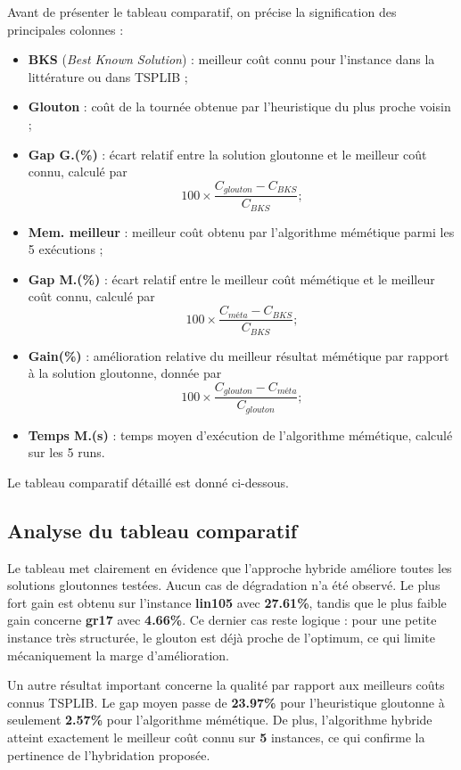 \documentclass[11pt,a4paper]{article}
\begin{document}
Avant de présenter le tableau comparatif, on précise la signification des principales colonnes :
\begin{itemize}[leftmargin=1.1cm]
    \item \textbf{BKS} (\emph{Best Known Solution}) : meilleur coût connu pour l'instance dans la littérature ou dans TSPLIB ;
    \item \textbf{Glouton} : coût de la tournée obtenue par l'heuristique du plus proche voisin ;
    \item \textbf{Gap G.(\%)} : écart relatif entre la solution gloutonne et le meilleur coût connu, calculé par
    \[
    100 \times \frac{C_{glouton} - C_{BKS}}{C_{BKS}} ;
    \]
    \item \textbf{Mem. meilleur} : meilleur coût obtenu par l'algorithme mémétique parmi les 5 exécutions ;
    \item \textbf{Gap M.(\%)} : écart relatif entre le meilleur coût mémétique et le meilleur coût connu, calculé par
    \[
    100 \times \frac{C_{méta} - C_{BKS}}{C_{BKS}} ;
    \]
    \item \textbf{Gain(\%)} : amélioration relative du meilleur résultat mémétique par rapport à la solution gloutonne, donnée par
    \[
    100 \times \frac{C_{glouton} - C_{méta}}{C_{glouton}} ;
    \]
    \item \textbf{Temps M.(s)} : temps moyen d'exécution de l'algorithme mémétique, calculé sur les 5 runs.
\end{itemize}

Le tableau comparatif détaillé est donné ci-dessous.

\small

\normalsize

\subsection{Analyse du tableau comparatif}
Le tableau met clairement en évidence que l'approche hybride améliore toutes les solutions gloutonnes testées. Aucun cas de dégradation n'a été observé. Le plus fort gain est obtenu sur l'instance \textbf{lin105} avec \textbf{27.61\%}, tandis que le plus faible gain concerne \textbf{gr17} avec \textbf{4.66\%}. Ce dernier cas reste logique : pour une petite instance très structurée, le glouton est déjà proche de l'optimum, ce qui limite mécaniquement la marge d'amélioration.

Un autre résultat important concerne la qualité par rapport aux meilleurs coûts connus TSPLIB. Le gap moyen passe de \textbf{23.97\%} pour l'heuristique gloutonne à seulement \textbf{2.57\%} pour l'algorithme mémétique. De plus, l'algorithme hybride atteint exactement le meilleur coût connu sur \textbf{5} instances, ce qui confirme la pertinence de l'hybridation proposée.
\end{document}
